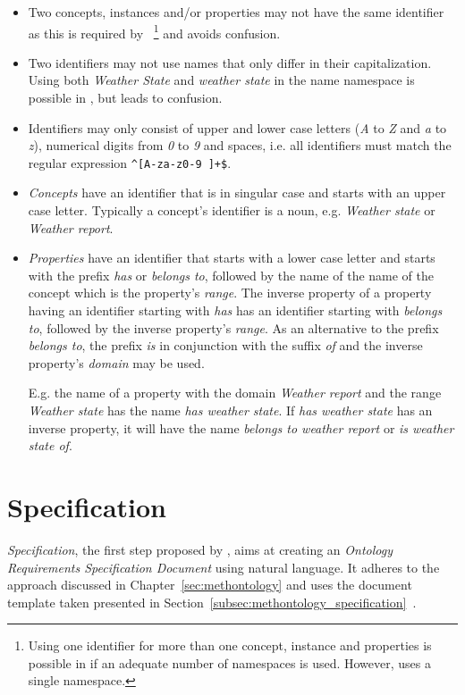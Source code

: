 \begin{itemize}
  \item Two concepts, instances and/or properties may not have the same identifier as this is required by ~\cite{OWL}\footnote{Using one identifier for more than one concept, instance and properties is possible in  if an adequate number of namespaces is used. However, \smarthomeweather uses a single namespace.} and avoids confusion.
  \item Two identifiers may not use names that only differ in their capitalization. Using both \emph{Weather State} and \emph{weather state} in the name namespace is possible in , but leads to confusion.
  \item Identifiers may only consist of upper and lower case  letters (\emph{A} to \emph{Z} and \emph{a} to \emph{z}), numerical digits from \emph{0} to \emph{9} and spaces, i.e. all identifiers must match the regular expression \texttt{\textasciicircum[A-za-z0-9~]+\$}.
  \item \emph{Concepts} have an identifier that is in singular case and starts with an upper case letter. Typically a concept's identifier is a noun, e.g. \emph{Weather state} or \emph{Weather report}.
  \item \emph{Properties} have an identifier that starts with a lower case letter and starts with the prefix \emph{has} or \emph{belongs to}, followed by the name of the name of the concept which is the property's \emph{range}. The inverse property of a property having an identifier starting with \emph{has} has an identifier starting with \emph{belongs to}, followed by the inverse property's \emph{range}. As an alternative to the prefix \emph{belongs to}, the prefix \emph{is} in conjunction with the suffix \emph{of} and the inverse property's \emph{domain} may be used.
  
  E.g. the name of a property with the domain \emph{Weather report} and the range \emph{Weather state} has the name \emph{has weather state}. If \emph{has weather state} has an inverse property, it will have the name \emph{belongs to weather report} or \emph{is weather state of}.
\end{itemize}


\section{Specification}
\label{sec:ontology_specification}

\emph{Specification}, the first step proposed by \methontology, aims at creating an \emph{Ontology Requirements Specification Document} using natural language. It adheres to the approach discussed in Chapter~\ref{sec:methontology} and uses the document template taken presented in Section~\ref{subsec:methontology_specification}~\cite{ORSD}.

